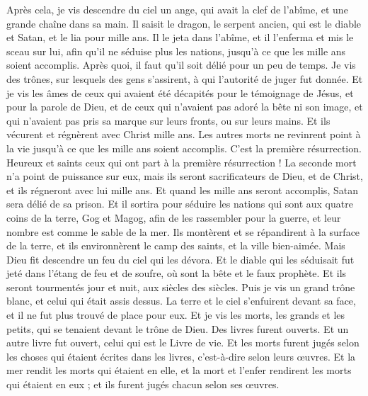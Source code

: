 \begin{multicols}{2}
\VerseOne{}Après cela, je vis descendre du ciel un ange, qui avait la clef de l'abîme, et une grande chaîne dans sa main.
Il saisit le dragon, le serpent ancien, qui est le diable et Satan, et le lia pour mille ans.
Il le jeta dans l'abîme, et il l'enferma et mis le sceau sur lui, afin qu'il ne séduise plus les nations, jusqu'à ce que les mille ans soient accomplis. Après quoi, il faut qu'il soit délié pour un peu de temps.
Je vis des trônes, sur lesquels des gens s'assirent, à qui l'autorité de juger fut donnée. Et je vis les âmes de ceux qui avaient été décapités pour le témoignage de Jésus, et pour la parole de Dieu, et de ceux qui n'avaient pas adoré la bête ni son image, et qui n'avaient pas pris sa marque sur leurs fronts, ou sur leurs mains. Et ils vécurent et régnèrent avec Christ mille ans.
Les autres morts ne revinrent point à la vie jusqu'à ce que les mille ans soient accomplis. C'est la première résurrection.
Heureux et saints ceux qui ont part à la première résurrection ! La seconde mort n'a point de puissance sur eux, mais ils seront sacrificateurs de Dieu, et de Christ, et ils régneront avec lui mille ans.
Et quand les mille ans seront accomplis, Satan sera délié de sa prison.
Et il sortira pour séduire les nations qui sont aux quatre coins de la terre, Gog et Magog, afin de les rassembler pour la guerre, et leur nombre est comme le sable de la mer.
Ils montèrent et se répandirent à la surface de la terre, et ils environnèrent le camp des saints, et la ville bien-aimée. Mais Dieu fit descendre un feu du ciel qui les dévora.
Et le diable qui les séduisait fut jeté dans l'étang de feu et de soufre, où sont la bête et le faux prophète. Et ils seront tourmentés jour et nuit, aux siècles des siècles.
Puis je vis un grand trône blanc, et celui qui était assis dessus. La terre et le ciel s'enfuirent devant sa face, et il ne fut plus trouvé de place pour eux.
Et je vis les morts, les grands et les petits, qui se tenaient devant le trône de Dieu. Des livres furent ouverts. Et un autre livre fut ouvert, celui qui est le Livre de vie. Et les morts furent jugés selon les choses qui étaient écrites dans les livres, c'est-à-dire selon leurs œuvres.
Et la mer rendit les morts qui étaient en elle, et la mort et l'enfer rendirent les morts qui étaient en eux ; et ils furent jugés chacun selon ses œuvres.

\end{multicols}
